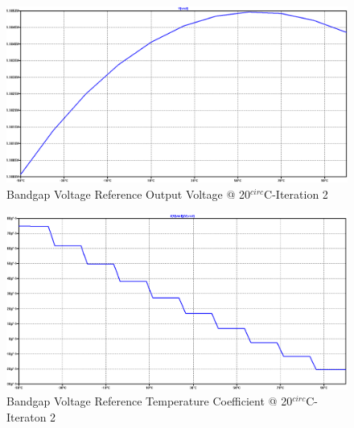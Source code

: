 \begin{figure}[!htbp]
  	\centering
  	\includegraphics[scale=0.15]{images/appendix/bg2-vref.png}
  	\caption[output-z-meas]{Bandgap Voltage Reference Output Voltage @ 20$^{circ}$C-Iteration 2}
  	\label{fig:bg1-vref}
	\end{figure}
\begin{figure}[!htbp]
  	\centering
  	\includegraphics[scale=0.15]{images/appendix/bg2-tempco.png}
  	\caption[output-z-meas]{Bandgap Voltage Reference Temperature Coefficient @ 20$^{circ}$C-Iteraton 2}
  	\label{fig:bg1-tempco}
	\end{figure}

